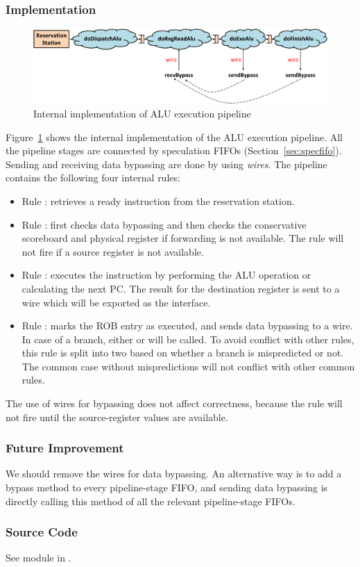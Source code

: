 \subsubsection{Implementation}

\begin{figure}
    \centering
    \includegraphics[width=\columnwidth]{fig/alu_exe_crop.pdf}
    \caption{Internal implementation of ALU execution pipeline}\label{fig:alu-exe-pipe-impl}
\end{figure}

Figure~\ref{fig:alu-exe-pipe-impl} shows the internal implementation of the ALU execution pipeline.
All the pipeline stages are connected by speculation FIFOs (Section~\ref{sec:specfifo}).
Sending and receiving data bypassing are done by using \emph{wires}.
The pipeline contains the following four internal rules:
\begin{itemize}
    \item Rule : retrieves a ready instruction from the reservation station.
    \item Rule : first checks data bypassing and then checks the conservative scoreboard and physical register if forwarding is not available.
    The rule will not fire if a source register is not available.
    \item Rule : executes the instruction by performing the ALU operation or calculating the next PC.
    The result for the destination register is sent to a wire which will be exported as the  interface.
    \item Rule : marks the ROB entry as executed, and sends data bypassing to a wire.
    In case of a branch, either  or  will be called.
    To avoid conflict with other rules, this rule is split into two based on whether a branch is mispredicted or not.
    The common case without mispredictions will not conflict with other common rules.
\end{itemize}
The use of wires for bypassing does not affect correctness, because the  rule will not fire until the source-register values are available.

\subsubsection{Future Improvement}
We should remove the wires for data bypassing.
An alternative way is to add a bypass method to every pipeline-stage FIFO, and sending data bypassing is directly calling this method of all the relevant pipeline-stage FIFOs.

\subsubsection{Source Code}
See module  in .
